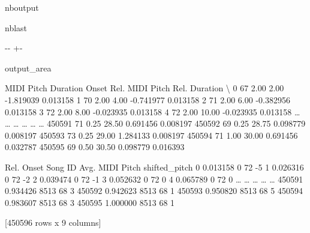 \documentclass[letterpaper,10pt,english]{sphinxmanual}
\newlength\nbsphinxcodecellspacing
\begin{document}
\begin{sphinxuseclass}{nboutput}
\begin{sphinxuseclass}{nblast}
{

\kern-\sphinxverbatimsmallskipamount\kern-\baselineskip
\kern+\FrameHeightAdjust\kern-\fboxrule
\vspace{\nbsphinxcodecellspacing}

\begin{sphinxuseclass}{output_area}
\begin{sphinxuseclass}{}


\begin{sphinxVerbatim}[commandchars=\\\{\}]
\llap{\color{nbsphinxout}[53]:\,\hspace{\fboxrule}\hspace{\fboxsep}}        MIDI Pitch  Duration  Onset  Rel. MIDI Pitch  Rel. Duration  \textbackslash{}
0               67      2.00   2.00        -1.819039       0.013158
1               70      2.00   4.00        -0.741977       0.013158
2               71      2.00   6.00        -0.382956       0.013158
3               72      2.00   8.00        -0.023935       0.013158
4               72      2.00  10.00        -0.023935       0.013158
{\ldots}            {\ldots}       {\ldots}    {\ldots}              {\ldots}            {\ldots}
450591          71      0.25  28.50         0.691456       0.008197
450592          69      0.25  28.75         0.098779       0.008197
450593          73      0.25  29.00         1.284133       0.008197
450594          71      1.00  30.00         0.691456       0.032787
450595          69      0.50  30.50         0.098779       0.016393

        Rel. Onset  Song ID  Avg. MIDI Pitch  shifted\_pitch
0         0.013158        0               72             -5
1         0.026316        0               72             -2
2         0.039474        0               72             -1
3         0.052632        0               72              0
4         0.065789        0               72              0
{\ldots}            {\ldots}      {\ldots}              {\ldots}            {\ldots}
450591    0.934426     8513               68              3
450592    0.942623     8513               68              1
450593    0.950820     8513               68              5
450594    0.983607     8513               68              3
450595    1.000000     8513               68              1

[450596 rows x 9 columns]
\end{sphinxVerbatim}



\end{sphinxuseclass}
\end{sphinxuseclass}
}

\end{sphinxuseclass}
\end{sphinxuseclass}
\end{document}
